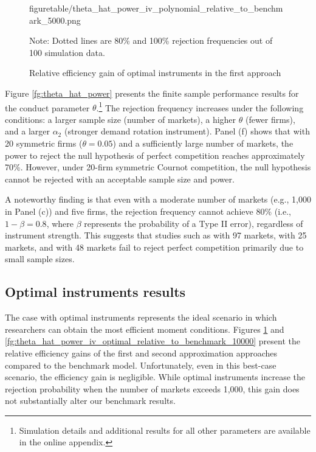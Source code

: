 \documentclass[11pt, a4paper]{article}
\begin{document}
\begin{figure}[!ht]
\begin{center}
{  {figuretable/theta_hat_power_iv_polynomial_relative_to_benchmark_5000.png}}
  \caption{Relative efficiency gain of optimal instruments in the first approach}
  \label{fg:theta_hat_power_iv_polynomial_relative_to_benchmark}
  \end{center}
  \footnotesize
  Note: Dotted lines are 80\% and 100\% rejection frequencies out of 100 simulation data.
\end{figure} 

Figure \ref{fg:theta_hat_power} presents the finite sample performance results for the conduct parameter $\theta$.\footnote{Simulation details and additional results for all other parameters are available in the online appendix.} The rejection frequency increases under the following conditions: a larger sample size (number of markets), a higher $\theta$ (fewer firms), and a larger $\alpha_2$ (stronger demand rotation instrument). Panel (f) shows that with 20 symmetric firms ($\theta=0.05$) and a sufficiently large number of markets, the power to reject the null hypothesis of perfect competition reaches approximately 70\%. However, under 20-firm symmetric Cournot competition, the null hypothesis cannot be rejected with an acceptable sample size and power.

A noteworthy finding is that even with a moderate number of markets (e.g., 1,000 in Panel (c)) and five firms, the rejection frequency cannot achieve 80\% (i.e., $1-\beta=0.8$, where $\beta$ represents the probability of a Type II error), regardless of instrument strength. This suggests that studies such as \cite{genesove1998testing} with 97 markets, \cite{shaffer1993test} with 25 markets, and \cite{steen1999testing} with 48 markets fail to reject perfect competition primarily due to small sample sizes.

\subsection{Optimal instruments results}
The case with optimal instruments represents the ideal scenario in which researchers can obtain the most efficient moment conditions. Figures \ref{fg:theta_hat_power_iv_polynomial_relative_to_benchmark} and \ref{fg:theta_hat_power_iv_optimal_relative_to_benchmark_10000} present the relative efficiency gains of the first and second approximation approaches compared to the benchmark model. Unfortunately, even in this best-case scenario, the efficiency gain is negligible. While optimal instruments increase the rejection probability when the number of markets exceeds 1,000, this gain does not substantially alter our benchmark results.
\end{document}
